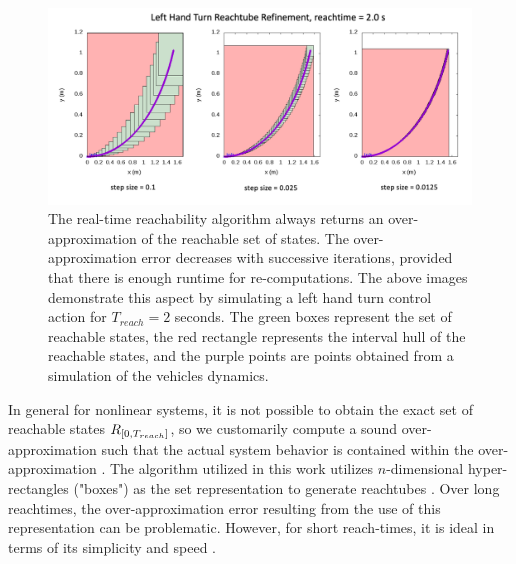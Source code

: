\documentclass[manuscript,screen,review]{acmart}
\newcommand{\diego}[1]{\textcolor{purple}{\textbf{\underline{DM:}} #1}}
\begin{document}
\begin{figure}[htbp]%
  \centering
  \includegraphics[width=0.90\linewidth]{figures/refinement_cropped.pdf}
  \caption{The real-time reachability algorithm always returns an over-approximation of the reachable set of states. The over-approximation error decreases with successive iterations, provided that there is enough runtime for re-computations. The above images demonstrate this aspect by simulating a left hand turn control action for $T_{reach} = 2$ seconds. The green boxes represent the set of reachable states, the red rectangle represents the interval hull of the reachable states, and the purple points are points obtained from a simulation of the vehicles dynamics.}
  \label{fig:reach_refine}
\end{figure}%
In general for nonlinear systems, it is not possible to obtain the exact set of reachable states $\mathnormal{R}_{[0,T_{reach}]}$, so we customarily compute a sound over-approximation such that the actual system behavior is contained within the over-approximation \cite{AlthoffNonlinear,Lin2020,Asarin2003}. The algorithm utilized in this work utilizes $n$-dimensional hyper-rectangles ("boxes") as the set representation to generate reachtubes \cite{Johnson2016}. Over long reachtimes, the over-approximation error resulting from the use of this representation can be problematic. However, for short reach-times, it is ideal in terms of its simplicity and speed \cite{Bak2014}. 
\end{document}
